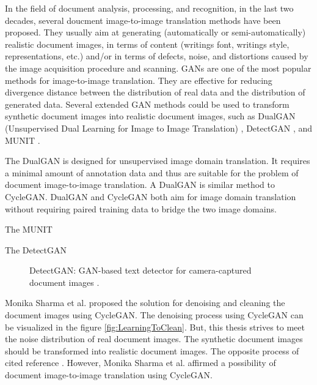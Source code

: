\justifying
\setlength{\parskip}{1em}


In the field of document analysis, processing, and recognition, in the last two decades, several doucment image-to-image translation methods have been proposed. They usually aim at generating (automatically or semi-automatically) realistic document images, in terms of content (writings font, writings style, representations, etc.) and/or in terms of defects, noise, and distortions caused by the image acquisition procedure and scanning. \acp{GAN} are one of the most popular methods for image-to-image translation. They are effective for reducing divergence distance between the distribution of real data and the distribution of generated data. Several extended \ac{GAN} methods could be used to transform synthetic document images into realistic document images, such as DualGAN (Unsupervised Dual Learning for Image to Image Translation) \cite{yi2018dualgan}, DetectGAN \cite{Zhao.2020}, and \ac{MUNIT} \cite{huang2018multimodal}.

The DualGAN is designed for unsupervised image domain translation. It requires a minimal amount of annotation data and thus are suitable for the problem of document image-to-image translation. A DualGAN is similar method to \ac{CycleGAN}. DualGAN and \ac{CycleGAN} both aim for image domain translation without requiring paired training data to bridge the two image domains.




The \ac{MUNIT} 



The DetectGAN \cite{Zhao.2020}


\begin{figure}[!htbp]
        \begin{center}
	    \caption[DetectGAN: GAN-based text detector for camera-captured document images.]{DetectGAN: GAN-based text detector for camera-captured document images \cite{Zhao.2020}.}
	    \label{fig:DetectGAN}
	    \end{center}
\end{figure}


Monika Sharma et al. \cite{sharma2019learning} proposed the solution for denoising and cleaning the document images using \ac{CycleGAN}. The denoising process using \ac{CycleGAN} can be visualized in the figure \ref{fig:LearningToClean}. But, this thesis strives to meet the noise distribution of real document images. The synthetic document images should be transformed into realistic document images. The opposite process of cited reference \cite{sharma2019learning}. However, Monika Sharma et al. affirmed a possibility of document image-to-image translation using \ac{CycleGAN}.


